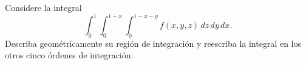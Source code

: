 Considere la integral
\[
\int_0^1\int_0^{1-x}\int_0^{1-x-y}
f(x,y,z)\,dz\,dy\,dx.
\]
Describa geométricamente su región de integración y reescriba la integral en los otros cinco órdenes de integración.
